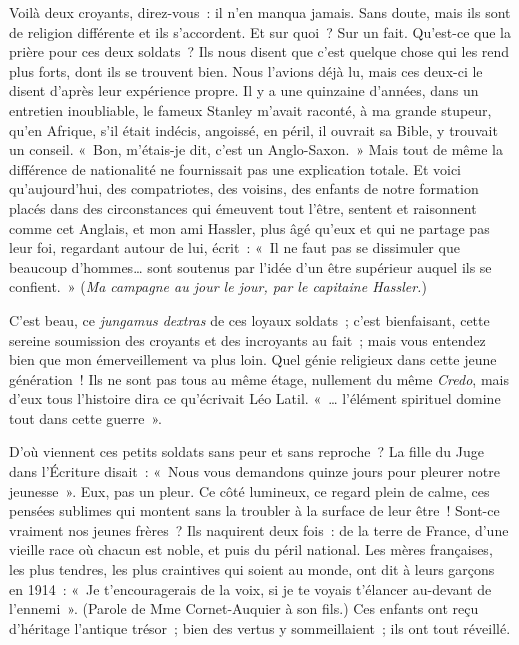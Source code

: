 \documentclass[french,twoside]{book} %
\begin{document}
\noindent Voilà deux croyants, direz-vous : il n’en manqua jamais. Sans doute, mais ils sont de religion différente et ils s’accordent. Et sur quoi ? Sur un fait. Qu’est-ce que la prière pour ces deux soldats ? Ils nous disent que c’est quelque chose qui les rend plus forts, dont ils se trouvent bien. Nous l’avions déjà lu, mais ces deux-ci le disent d’après leur expérience propre. Il y a une quinzaine d’années, dans un entretien inoubliable, le fameux Stanley m’avait raconté, à ma grande stupeur, qu’en Afrique, s’il était indécis, angoissé, en péril, il ouvrait sa Bible, y trouvait un conseil. « Bon, m’étais-je dit, c’est un Anglo-Saxon. » Mais tout de même la différence de nationalité ne fournissait pas une explication totale. Et voici qu’aujourd’hui, des compatriotes, des voisins, des enfants de notre formation placés dans des circonstances qui émeuvent tout l’être, sentent et raisonnent comme cet Anglais, et mon ami Hassler, plus âgé qu’eux et qui ne partage pas leur foi, regardant autour de lui, écrit : « Il ne faut pas se dissimuler que beaucoup d’hommes… sont soutenus par l’idée d’un être supérieur auquel ils se confient. » ({\itshape Ma campagne au jour le jour, par le capitaine Hassler.}‌)\par
C’est beau, ce {\itshape jungamus dextras} de ces loyaux soldats ; c’est bienfaisant, cette sereine soumission des croyants et des incroyants au fait ; mais vous entendez bien que mon émerveillement va plus loin. Quel génie religieux dans cette jeune génération ! Ils ne sont pas tous au même étage, nullement du même {\itshape Credo}, mais d’eux tous l’histoire dira ce qu’écrivait Léo Latil. « … l’élément spirituel domine tout dans cette guerre ».‌\par
D’où viennent ces petits soldats sans peur et sans reproche ? La fille du Juge dans l’Écriture disait : « Nous vous demandons quinze jours pour pleurer notre jeunesse ». Eux, pas un pleur. Ce côté lumineux, ce regard plein de calme, ces pensées sublimes qui montent sans la troubler à la surface de leur être ! Sont-ce vraiment nos jeunes frères ? Ils naquirent deux fois : de la terre de France, d’une vieille race où chacun est noble, et puis du péril national. Les mères françaises, les plus tendres, les plus craintives qui soient au monde, ont dit à leurs garçons en 1914 : « Je t’encouragerais de la voix, si je te voyais t’élancer au-devant de l’ennemi ». (Parole de Mme Cornet-Auquier à son fils.) Ces enfants ont reçu d’héritage l’antique trésor ; bien des vertus y sommeillaient ; ils ont tout réveillé.‌\par
\end{document}
